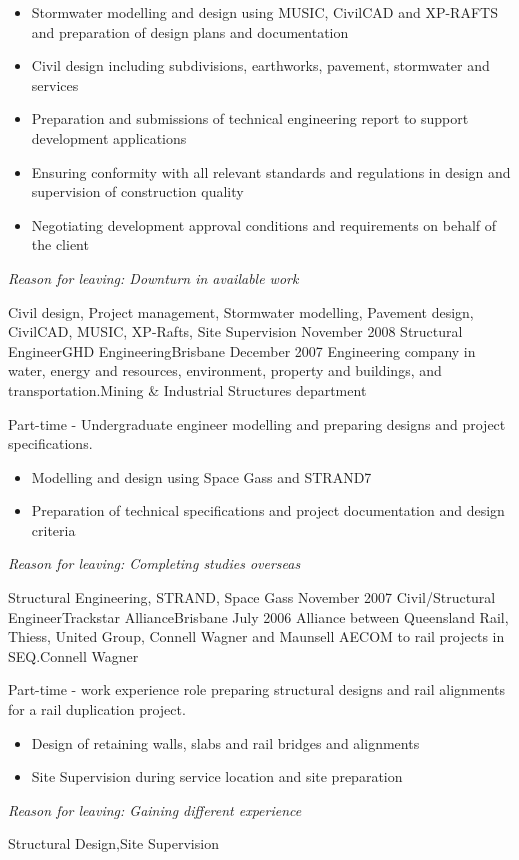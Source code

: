 \begin{experiences}
{\begin{itemize}
		\item Stormwater modelling and design using MUSIC, CivilCAD and XP-RAFTS and preparation of design plans and documentation
		\item Civil design including subdivisions, earthworks, pavement, stormwater and services
		\item Preparation and submissions of technical engineering report to support development applications
		\item Ensuring conformity with all relevant standards and regulations in design and supervision of construction quality   
		\item Negotiating development approval conditions and requirements on behalf of the client
               \end{itemize}
                    \textit{Reason for leaving: Downturn in available work}
                    }
                    {Civil design, Project management, Stormwater modelling, Pavement design, CivilCAD, MUSIC, XP-Rafts, Site Supervision}
  \emptySeparator
  \consultantexperience
  {November 2008}      {Structural Engineer}{GHD Engineering}{Brisbane}
  {December 2007}      {Engineering company in water, energy and resources, environment, property and buildings, and transportation.}{Mining \& Industrial Structures department}
   { Part-time - Undergraduate engineer modelling and preparing designs and project specifications.
                    
        \begin{itemize}
		\item Modelling and design using Space Gass and STRAND7
		\item Preparation of technical specifications and project documentation and design criteria
               \end{itemize}
                    \textit{Reason for leaving: Completing studies overseas}
                    }
                    {Structural Engineering, STRAND, Space Gass} 
  \emptySeparator   
  \consultantexperience
  {November 2007}    {Civil/Structural Engineer}{Trackstar Alliance}{Brisbane}
  {July 2006}       {Alliance between Queensland Rail, Thiess, United Group, Connell Wagner and Maunsell AECOM to rail projects in SEQ.}{Connell Wagner}
  		{Part-time - work experience role preparing structural designs and rail alignments for a rail duplication project.                 
                      \begin{itemize}
		\item Design of retaining walls, slabs and rail bridges and alignments
		\item Site Supervision during service location and site preparation
                      \end{itemize}
                    \textit{Reason for leaving: Gaining different experience}
                    }
                    {Structural Design,Site Supervision}   
  \emptySeparator            
\end{experiences}
